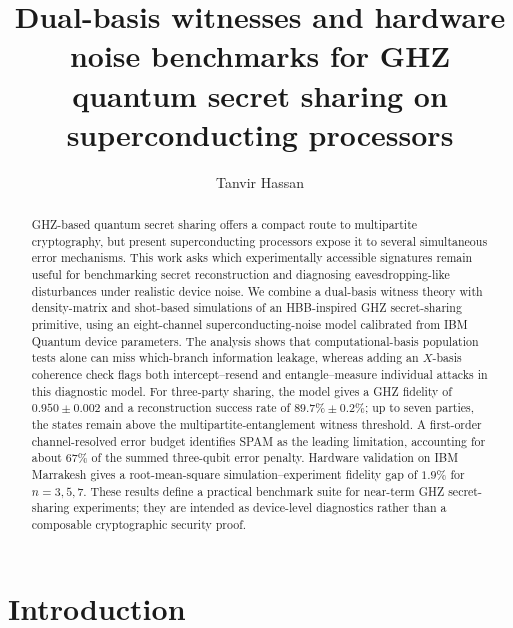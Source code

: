 \documentclass[aip,amsmath,amssymb,reprint,longbibliography]{revtex4-2}
\begin{document}
\title{Dual-basis witnesses and hardware noise benchmarks for GHZ quantum secret sharing on superconducting processors}

\author{Tanvir Hassan}

\begin{abstract}
GHZ-based quantum secret sharing offers a compact route to multipartite cryptography, but present superconducting processors expose it to several simultaneous error mechanisms.  This work asks which experimentally accessible signatures remain useful for benchmarking secret reconstruction and diagnosing eavesdropping-like disturbances under realistic device noise.  We combine a dual-basis witness theory with density-matrix and shot-based simulations of an HBB-inspired GHZ secret-sharing primitive, using an eight-channel superconducting-noise model calibrated from IBM Quantum device parameters.  The analysis shows that computational-basis population tests alone can miss which-branch information leakage, whereas adding an $X$-basis coherence check flags both intercept--resend and entangle--measure individual attacks in this diagnostic model.  For three-party sharing, the model gives a GHZ fidelity of $0.950\pm0.002$ and a reconstruction success rate of $89.7\%\pm0.2\%$; up to seven parties, the states remain above the multipartite-entanglement witness threshold.  A first-order channel-resolved error budget identifies SPAM as the leading limitation, accounting for about $67\%$ of the summed three-qubit error penalty.  Hardware validation on IBM Marrakesh gives a root-mean-square simulation--experiment fidelity gap of $1.9\%$ for $n=3,5,7$.  These results define a practical benchmark suite for near-term GHZ secret-sharing experiments; they are intended as device-level diagnostics rather than a composable cryptographic security proof.
\end{abstract}

\maketitle

\section{Introduction}
\label{sec:introduction}
\end{document}
